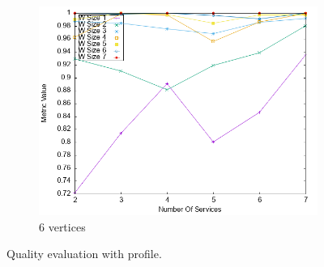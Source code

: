 \begin{figure}[h]
\begin{subfigure}{0.33\textwidth}
    \includegraphics[width=\textwidth]{Images/graphs/newwindow_quality_performance_diff_perce_n7_s7_50_89_n7}
    \caption{6 vertices}
    \label{fig:quality_window_average_perce_7n}
  \end{subfigure}
  \caption{ Quality evaluation with \average profile.}
  \label{fig:quality_window_average_perce}
\end{figure}


